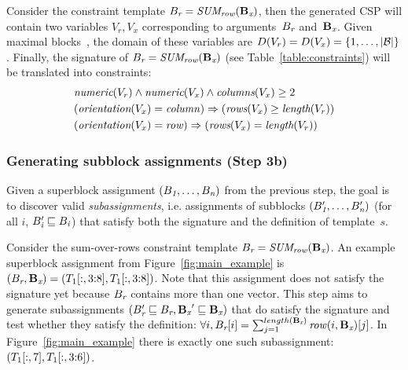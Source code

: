 \begin{example}

  Consider the constraint template $B_{\textit{r}} = \textit{SUM\textsubscript{row}}(\mathbf{B_{\textit{x}}})$, then the generated CSP will contain two variables $V_r, V_x$ corresponding to arguments~$B_{\textit{r}}$ and~$\mathbf{B_{\textit{x}}}$.
  Given maximal blocks~\blocks, the domain of these variables are $D(V_r) = D(V_x) = \{ 1, \dots, |\mathcal{B}| \}$.
  Finally, the signature of $B_{\textit{r}} = \textit{SUM\textsubscript{row}}(\mathbf{B_{\textit{x}}})$ (see Table~\ref{table:constraints}) will be translated into constraints:
  \begin{align*}
    & \textit{numeric}(V_r) \land \textit{numeric}(V_x) \land \textit{columns}(V_x) \geq 2 \\
    & (\textit{orientation}(V_x) = \mathit{column}) \Rightarrow (\textit{rows}(V_x) \geq \textit{length}(V_r)) \\
    & (\textit{orientation}(V_x) = \mathit{row}) \Rightarrow (\textit{rows}(V_x) = \textit{length}(V_r))
  \end{align*}
\end{example}





\subsubsection{Generating subblock assignments (Step 3b)}
\label{sec:algo:subgr}

Given a superblock assignment $(B_{\textit{1}}, \dots, B_{\textit{n}})$ from the previous step, the goal is to discover valid \textit{subassignments}, i.e. assignments of subblocks $(B'_{\textit{1}}, \dots, B'_{\textit{n}})$ (for all $i$, $B'_{\textit{i}} \sqsubseteq B_{\textit{i}}$) that satisfy both the signature and the definition of template~$s$.

\begin{example}
  Consider the sum-over-rows constraint template $B_{\textit{r}} = \textit{SUM\textsubscript{row}}(\mathbf{B_{\textit{x}}})$.
  An example superblock assignment from Figure~\ref{fig:main_example} is $(B_{\textit{r}}, \mathbf{B_{\textit{x}}}) = (T_1[:,3{:}8], T_1[:,3{:}8])$.
  Note that this assignment does not satisfy the signature yet because $B_{\textit{r}}$ contains more than one vector.
  This step aims to generate subassignments $(B_{\textit{r}}' \sqsubseteq B_{\textit{r}}, \mathbf{B_{\textit{x}}}' \sqsubseteq \mathbf{B_{\textit{x}}})$ that do satisfy the signature and test whether they satisfy the definition:
  $\forall i, B_{\textit{r}}[i] = \sum_{j = 1}^{length(\mathbf{B_{\textit{x}}})} \mathit{row}(i, \mathbf{B_{\textit{x}}})[j]$.
  In Figure~\ref{fig:main_example} there is exactly one such subassignment: $(T_1[:,7], T_1[:,3{:}6])$.
\end{example}

